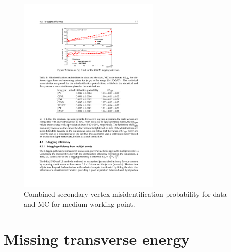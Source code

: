 \begin{figure}[ht]
\centering
	\includegraphics[width=0.6\textwidth]{Figures/MisID_CSVM.pdf}
	\caption{Combined secondary vertex misidentification probability for data and MC for medium working point.\cite{CMS:2013vea}}
	\label{fig:misID}
\end{figure}




\section{Missing transverse energy}

